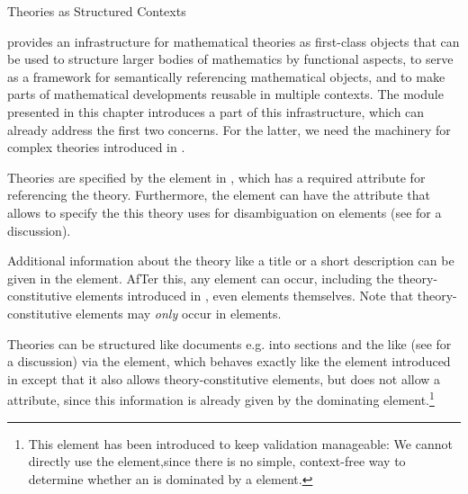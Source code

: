 \begin{omgroup}[short=Mathematical Statements,id=statements]
\begin{omgroup}[id=theories-contexts]{Theories as Structured Contexts}
\begin{module}[id=theories]
{\omdoc} provides an infrastructure for mathematical theories as first-class objects that
can be used to structure larger bodies of mathematics by functional aspects, to serve as a
framework for semantically referencing mathematical objects, and to make parts of
mathematical developments reusable in multiple contexts. The module {}
presented in this chapter introduces a part of this infrastructure, which can already
address the first two concerns. For the latter, we need the machinery for complex theories
introduced in {}.

\begin{definition}[id=theory.def]
  Theories are specified by the {} element in {\omdoc}, which has a required
  {} attribute for referencing the theory. Furthermore,
  the {} element can have the {}
  attribute that allows to specify the {} this theory uses for
  disambiguation on {} elements (see {} for a
  discussion).
\end{definition}
Additional information about the theory like a title or a short description can be given
in the {} element. AfTer this, any {} {\omdoc}
element can occur, including the theory-constitutive elements introduced in
{}, even {} elements
themselves. Note that theory-constitutive elements may {\emph{only}} occur in
{} elements.

\begin{definition}[id=tgroup.def]
  Theories can be structured like documents e.g. into sections and the like (see
  {} for a discussion) via the {} element, which behaves
  exactly like the {} element introduced in {} except that
  it also allows theory-constitutive elements, but does not allow a
  {} attribute, since this information is already given by the
  dominating {} element.\footnote{This element has been introduced to keep
    {\omdoc} validation manageable: We cannot directly use the {}
    element,since there is no simple, context-free way to determine whether an
    {} is dominated by a {} element.}
\end{definition}  


\end{module}
\end{omgroup}
\end{omgroup}
